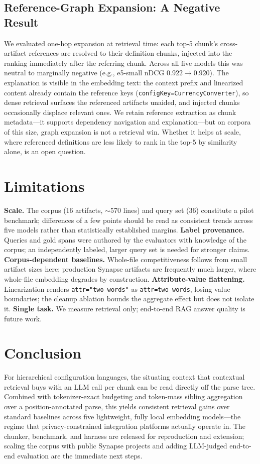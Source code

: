\documentclass[conference]{IEEEtran}
\begin{document}
\subsection{Reference-Graph Expansion: A Negative Result}\label{sec:refexp}
We evaluated one-hop expansion at retrieval time: each top-5 chunk's cross-artifact references are resolved to their definition chunks, injected into the ranking immediately after the referring chunk. Across all five models this was neutral to marginally negative (e.g., e5-small nDCG $0.922 \rightarrow 0.920$). The explanation is visible in the embedding text: the context prefix and linearized content already contain the reference keys (\texttt{configKey=CurrencyConverter}), so dense retrieval surfaces the referenced artifacts unaided, and injected chunks occasionally displace relevant ones. We retain reference extraction as chunk metadata---it supports dependency navigation and explanation---but on corpora of this size, graph expansion is not a retrieval win. Whether it helps at scale, where referenced definitions are less likely to rank in the top-5 by similarity alone, is an open question.

\section{Limitations}\label{sec:limitations}
\textbf{Scale.} The corpus (16 artifacts, $\sim$570 lines) and query set (36) constitute a pilot benchmark; differences of a few points should be read as consistent trends across five models rather than statistically established margins. \textbf{Label provenance.} Queries and gold spans were authored by the evaluators with knowledge of the corpus; an independently labeled, larger query set is needed for stronger claims. \textbf{Corpus-dependent baselines.} Whole-file competitiveness follows from small artifact sizes here; production Synapse artifacts are frequently much larger, where whole-file embedding degrades by construction. \textbf{Attribute-value flattening.} Linearization renders \texttt{attr="two words"} as \texttt{attr=two words}, losing value boundaries; the cleanup ablation bounds the aggregate effect but does not isolate it. \textbf{Single task.} We measure retrieval only; end-to-end RAG answer quality is future work.

\section{Conclusion}
For hierarchical configuration languages, the situating context that contextual retrieval buys with an LLM call per chunk can be read directly off the parse tree. Combined with tokenizer-exact budgeting and token-mass sibling aggregation over a position-annotated parse, this yields consistent retrieval gains over standard baselines across five lightweight, fully local embedding models---the regime that privacy-constrained integration platforms actually operate in. The chunker, benchmark, and harness are released for reproduction and extension; scaling the corpus with public Synapse projects and adding LLM-judged end-to-end evaluation are the immediate next steps.
\end{document}
